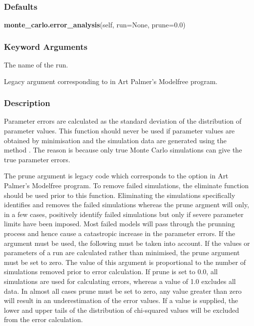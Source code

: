\subsubsection{Defaults}

\textsf{\textbf{monte\_carlo.error\_analysis}(self, run=None, prune=0.0)}


\subsubsection{Keyword Arguments}


  The name of the run.

  Legacy argument corresponding to 
 in Art Palmer's Modelfree program.

\subsubsection{Description}

Parameter errors are calculated as the standard deviation of the distribution of parameter
values.  This function should never be used if parameter values are obtained by minimisation
and the simulation data are generated using the method 
.  The reason is because only
true Monte Carlo simulations can give the true parameter errors.

The prune argument is legacy code which corresponds to the 
 option in Art Palmer's
Modelfree program.  To remove failed simulations, the eliminate function should be used
prior to this function.  Eliminating the simulations specifically identifies and removes the
failed simulations whereas the prune argment will only, in a few cases, positively identify
failed simulations but only if severe parameter limits have been imposed.  Most failed
models will pass through the prunning process and hence cause a catastropic increase in the
parameter errors.  If the argument must be used, the following must be taken into account.
If the values or parameters of a run are calculated rather than minimised, the prune
argument must be set to zero.  The value of this argument is proportional to the number of
simulations removed prior to error calculation.  If prune is set to 0.0, all simulations are
used for calculating errors, whereas a value of 1.0 excludes all data.  In almost all cases
prune must be set to zero, any value greater than zero will result in an underestimation of
the error values.  If a value is supplied, the lower and upper tails of the distribution of
chi-squared values will be excluded from the error calculation.



